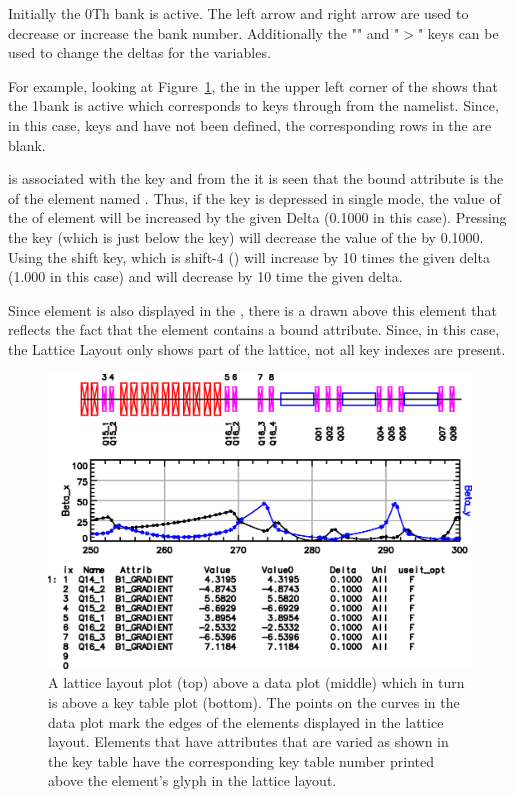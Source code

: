 Initially the 0Th bank is active. The left arrow and right arrow are
used to decrease or increase the bank number.  Additionally the
"\vn{<}" and "$>$" keys can be used to change the deltas for the
variables.

For example, looking at Figure~\ref{f:key.table}, the  in
the upper left corner of the  shows that the 1\St bank
is active which corresponds to keys  through 
from the  namelist.  Since, in this case, keys
 and  have not been defined, the corresponding
rows in the  are blank.

 is associated with the  key and from the  it is seen that the bound attribute is the  of
the element named .  Thus, if the  key is depressed
in single mode, the value of the  of element
 will be increased by the given Delta (0.1000 in this
case). Pressing the  key (which is just below the 
key) will decrease the value of the  by 0.1000. Using
the shift key, which is shift-4 () will increase
 by 10 times the given delta (1.000 in this case) and
 will decrease by 10 time the given delta.

Since element  is also displayed in the ,
there is a  drawn above this element that reflects the fact
that the element contains a bound attribute. Since, in this case, the
Lattice Layout only shows part of the lattice, not all key indexes are
present.


\begin{figure}
  \centering
  \includegraphics[width=5in]{layout-graph-table.eps}
  \caption[Example key table with a lattice layout and data plots.]
{A lattice layout plot (top) above a data plot (middle) 
which in turn is above a key table plot (bottom). The points on the
curves in the data plot mark the edges of the elements displayed in
the lattice layout. Elements that have attributes that are varied as
shown in the key table have the corresponding key table number printed
above the element's glyph in the lattice layout.}
  \label{f:key.table}
\end{figure}

